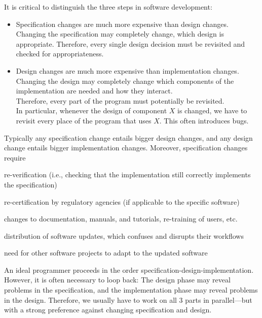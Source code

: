 It is critical to distinguish the three steps in software development:
\begin{itemize}
 \item Specification changes are much more expensive than design changes.
 Changing the specification may completely change, which design is appropriate.
 Therefore, every single design decision must be revisited and checked for appropriateness.
 \item Design changes are much more expensive than implementation changes.
 Changing the design may completely change which components of the implementation are needed and how they interact.\\
 Therefore, every part of the program must potentially be revisited. \\
 In particular, whenever the design of component $X$ is changed, we have to revisit every place of the program that uses $X$. 
 This often introduces bugs.
\end{itemize}
Typically any specification change entails bigger design changes, and any design change entails bigger implementation changes.
Moreover, specification changes require
\begin{compactitem}
	\item re-verification (i.e., checking that the implementation still correctly implements the specification)
	\item re-certification by regulatory agencies (if applicable to the specific software)
	\item changes to documentation, manuals, and tutorials, re-training of users, etc.
	\item distribution of software updates, which confuses and disrupts their workflows
	\item need for other software projects to adapt to the updated software
\end{compactitem}

An ideal programmer proceeds in the order specification-design-implementation.
However, it is often necessary to loop back: The design phase may reveal problems in the specification, and the implementation phase may reveal problems in the design.
Therefore, we usually have to work on all $3$ parts in parallel---but with a strong preference against changing specification and design.

